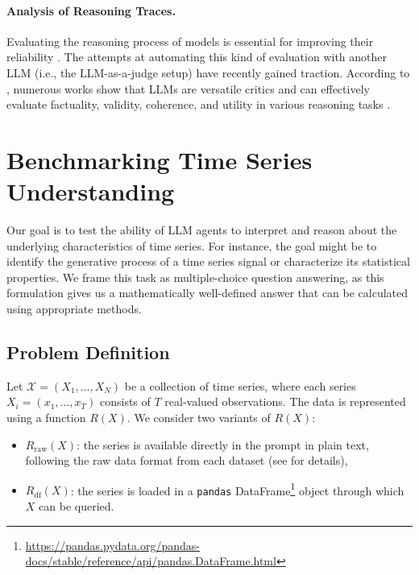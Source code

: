 \documentclass[11pt]{article}
\renewcommand{\cite}{\citep}
\begin{document}
\paragraph{Analysis of Reasoning Traces.} Evaluating the reasoning process of models is essential for improving their reliability \cite{lee2025evaluating}. The attempts at automating this kind of evaluation with another LLM (i.e., the LLM-as-a-judge setup) have recently gained traction. According to \citet{lee2025evaluating}, numerous works show that LLMs are versatile critics and can effectively evaluate factuality, validity, coherence, and utility in various reasoning tasks \cite{yao2023tree,jacovi2024chain,wu2024mitigating,niu2024ragtruth}.



  



\section{Benchmarking Time Series Understanding}
\label{sec:benchmarking}

Our goal is to test the ability of LLM agents to interpret and reason about the underlying characteristics of time series. For instance, the goal might be to identify the generative process of a time series signal or characterize its statistical properties. We frame this task as multiple-choice question answering, as this formulation gives us a mathematically well-defined answer that can be calculated using appropriate methods.

\subsection{Problem Definition}
Let $\mathcal{X} = (X_1, \ldots, X_N)$ be a collection of time series, where each series $X_i = (x_1, \dots, x_T)$ consists of $T$ real-valued observations. The data is represented using a function $R(X)$. We consider two variants of $R(X)$: 
\begin{itemize}

  \item $R_{\text{raw}}(X)$: the series is available directly in the prompt in plain text, following the raw data format from each dataset (see  for details),

  \item $R_{\text{df}}(X)$: the series is loaded in a \texttt{pandas} DataFrame\footnote{\url{https://pandas.pydata.org/pandas-docs/stable/reference/api/pandas.DataFrame.html}} object through which $X$ can be queried.
\end{itemize}
\end{document}
